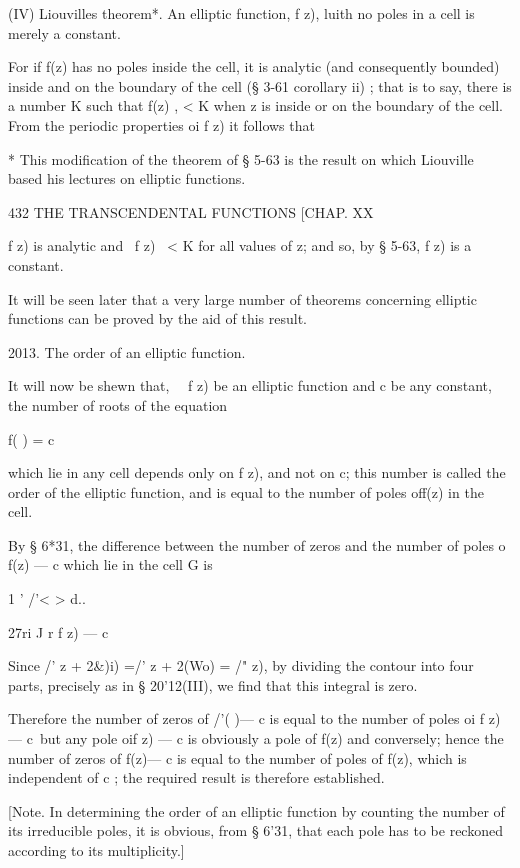 (IV) Liouvilles theorem*. An elliptic function, f z), luith no poles
in a cell is merely a constant.

For if f(z) has no poles inside the cell, it is analytic (and
consequently bounded) inside and on the boundary of the cell (§ 3-61
corollary ii) ; that is to say, there is a number K such that f(z) , <
K when z is inside or on the boundary of the cell. From the periodic
properties oi f z) it follows that

* This modification of the theorem of § 5-63 is the result on which
Liouville based his lectures on elliptic functions.



432 THE TRANSCENDENTAL FUNCTIONS [CHAP. XX

f z) is analytic and \ f z) \ < K for all values of z; and so, by §
5-63, f z) is a constant.

It will be seen later that a very large number of theorems concerning
elliptic functions can be proved by the aid of this result.

2013. The order of an elliptic function.

It will now be shewn that, \ \ f z) be an elliptic function and c be
any constant, the number of roots of the equation

f( ) = c

which lie in any cell depends only on f z), and not on c; this number
is called the order of the elliptic function, and is equal to the
number of poles off(z) in the cell.

By § 6*31, the difference between the number of zeros and the number
of poles o f(z) — c which lie in the cell G is

1 ' /'< > d..



27ri J r f z) — c

Since /' z + 2\&)i) =/' z + 2(Wo) = /" z), by dividing the contour
into four parts, precisely as in § 20'12(III), we find that this
integral is zero.

Therefore the number of zeros of /'( )— c is equal to the number of
poles oi f z) — c\ but any pole oif z) — c is obviously a pole of f(z)
and conversely; hence the number of zeros of f(z)— c is equal to the
number of poles of f(z), which is independent of c ; the required
result is therefore established.

[Note. In determining the order of an elliptic function by counting
the number of its irreducible poles, it is obvious, from § 6'31, that
each pole has to be reckoned according to its multiplicity.]

